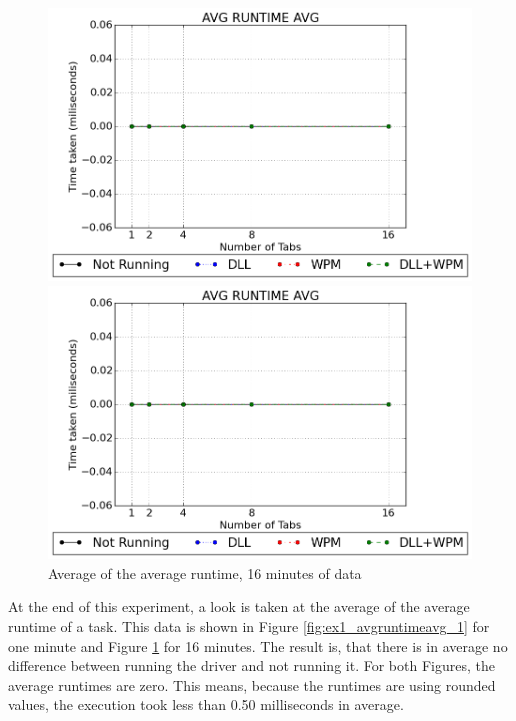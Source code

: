 \begin{figure}[!htbp]
	\centering
    \includegraphics[width=\textwidth,height=0.45\textheight,keepaspectratio]{Evaluation/experiment1/AVG-RUNTIME-AVG-1.png}
    \caption{Average of the average runtime, 1 minute of data}
    \label{fig:ex1_avgruntimeavg_1}
    
  	\vspace*{\floatsep}    
    
    \includegraphics[width=\textwidth,height=0.45\textheight,keepaspectratio]{Evaluation/experiment1/AVG-RUNTIME-AVG-16.png}
    \caption{Average of the average runtime, 16 minutes of data}
    \label{fig:ex1_avgruntimeavg_16}
\end{figure}
At the end of this experiment, a look is taken at the average of the average runtime of a task. This data is shown in Figure \ref{fig:ex1_avgruntimeavg_1} for one minute and Figure \ref{fig:ex1_avgruntimeavg_16} for 16 minutes. The result is, that there is in average no difference between running the driver and not running it. For both Figures, the average runtimes are zero. This means, because the runtimes are using rounded values, the execution took less than 0.50 milliseconds in average.

